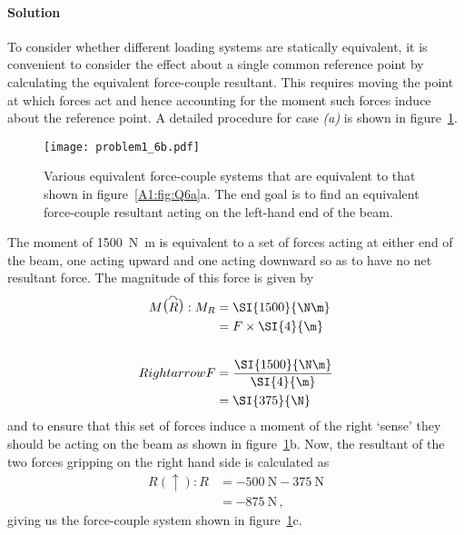 \documentclass[a4paper,justified,oneside]{tufte-handout}
\numberwithin{equation}{subsection}
\begin{document}
\begin{solution}
\paragraph{Solution}
To consider whether different loading systems are statically equivalent, it is convenient to consider the effect about a single common reference point by calculating the equivalent force-couple resultant. This requires moving the point at which forces act and hence accounting for the moment such forces induce about the reference point. A detailed procedure for case \textit{(a)} is shown in figure~\ref{A1:fig:Q6b}.
\begin{figure}
	\centering
	\texttt{[image: problem1\_6b.pdf]}
	\caption{Various equivalent force-couple systems that are equivalent to that shown in figure~\protect\ref{A1:fig:Q6a}a. The end goal is to find an equivalent force-couple resultant acting on the left-hand end of the beam.}
	\label{A1:fig:Q6b}
\end{figure}
The moment of \SI{1500}{\N\m} is equivalent to a set of forces acting at either end of the beam, one acting upward and one acting downward so as to have no net resultant force. The magnitude of this force is given by
\begin{align*}
	M\raisebox{1.5pt}{\big(}\overset{\curvearrowright}{R}\raisebox{1.5pt}{\big)}: M_R	&=	 \SI{1500}{\N\m}	\\
																						&=	F \times \SI{4}{\m}	\\
																	\\Rightarrow	F	&=	\frac{\SI{1500}{\N\m}}{\SI{4}{\m}}	\\
																						&=	\SI{375}{\N} \,
\end{align*}
and to ensure that this set of forces induce a moment of the right `sense' they should be acting on the beam as shown in figure~\ref{A1:fig:Q6b}b. Now, the resultant of the two forces gripping on the right hand side is calculated as
\begin{align*}
	R\left(\uparrow\right):	R	&=	\SI{-500}{\N} - \SI{375}{\N}	\\	
								&=	\SI{-875}{\N} \,,
\end{align*}
giving us the force-couple system shown in figure~\ref{A1:fig:Q6b}c.


\end{solution}
\end{document}
